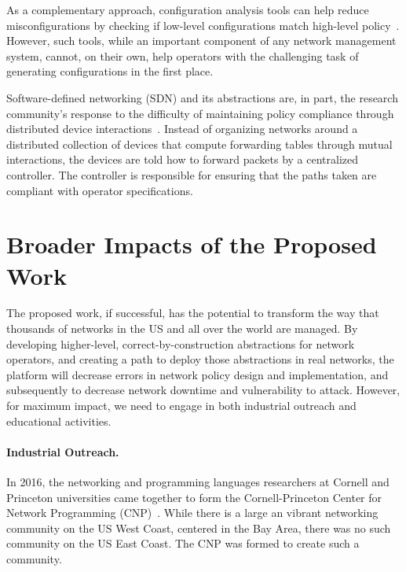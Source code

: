 As a complementary approach, configuration analysis tools can help
reduce misconfigurations by checking if low-level configurations match
high-level policy~\cite{batfish,feamster+:rcc}. However, such tools, while
an important component of any network management system,
cannot, on their own, help operators with the challenging task of generating
configurations in the first place.


Software-defined networking (SDN) and its abstractions
are, in part, the research
community's response to the difficulty of maintaining policy
compliance through distributed device interactions~\cite{ethane}.
Instead of organizing networks around a distributed
collection of devices that compute forwarding tables through
mutual interactions, the devices are told how to
forward packets by a centralized controller. The controller is responsible for ensuring that the
paths taken are compliant with operator specifications.



\section{Broader Impacts of the Proposed Work}
\label{sec:impact}

The proposed work, if successful, has the potential to transform the way
that thousands of networks in the US and all over the world are managed.
By developing higher-level, correct-by-construction abstractions for
network operators, and creating a path to deploy those abstractions
in real networks, the \Propane platform will decrease
errors in network policy design and implementation, and subsequently
to decrease network downtime and vulnerability to attack.  However,
for maximum impact, we need to engage in both industrial outreach and
educational activities.

\paragraph*{Industrial Outreach.}
In 2016, the networking and programming languages
researchers at Cornell and Princeton universities came together
to form the Cornell-Princeton Center for Network 
Programming (CNP)~\cite{center-for-network-programming}.
While there is a large an vibrant networking community on the US
West Coast, centered in the Bay Area, there was no such community on
the US East Coast.  The CNP was formed to create such a community.

